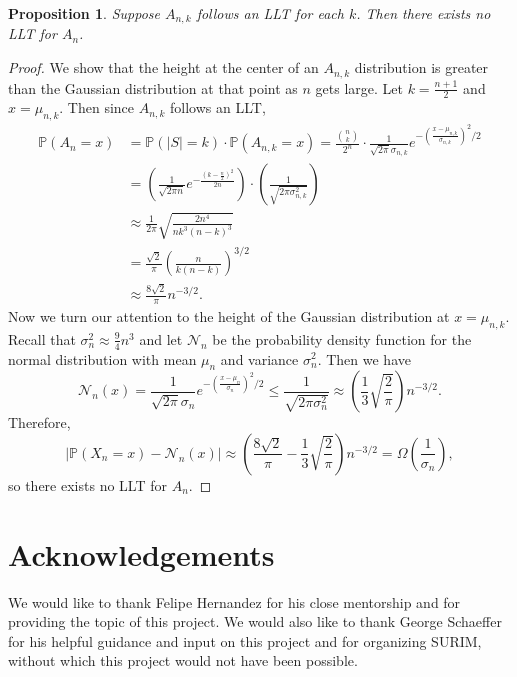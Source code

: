\documentclass[12pt]{article} %
\newcommand{\p}[1]{\left(#1\right)}
\newcommand{\abs}[1]{\left\lvert#1\right\rvert}
\renewcommand{\P}{\mathbb{P}}
\newtheorem{prop}[thm]{Proposition}
\theoremstyle{definition}
\theoremstyle{definition}
\begin{document}
\begin{prop}
Suppose $A_{n,k}$ follows an LLT for each $k$. Then there exists no LLT for $A_n$.
\end{prop}

\begin{proof}
We show that the height at the center of an $A_{n,k}$ distribution is greater than the Gaussian distribution at that point as $n$ gets large. 
Let $k = \frac{n+1}{2}$ and $x = \mu_{n,k}$. Then since $A_{n,k}$ follows an LLT,
\begin{align*}
\P(A_{n} = x) &= \P(|S| = k) \cdot \P(A_{n,k} = x) = \frac{{n\choose k}}{2^n} \cdot \frac{1}{\sqrt{2\pi}\sigma_{n,k}} e^{-\p{\frac{x-\mu_{n,k}}{\sigma_{n,k}}}^2/2} \\
&= \p{\frac{1}{\sqrt{2\pi n}} e^{-\frac{(k-\frac{n}{2})^2}{2n}}} \cdot \p{\frac{1}{\sqrt{2\pi\sigma_{n,k}^2}}} \\
& \approx \frac{1}{2\pi} \sqrt{\frac{2n^4}{nk^3(n-k)^3}} \\
&= \frac{\sqrt{2}}{\pi} \p{\frac{n}{k(n-k)}}^{3/2} \\
&\approx \frac{8\sqrt{2}}{\pi} n^{-3/2}.
\end{align*}
Now we turn our attention to the height of the Gaussian distribution at $x = \mu_{n,k}.$ Recall that $\sigma_n^2 \approx \frac{9}{4}n^3$ and let $\mathcal{N}_n$ be the probability density function for the normal distribution with mean $\mu_n$ and variance $\sigma_n^2$. Then we have
\[ \mathcal{N}_n(x) = \frac{1}{\sqrt{2\pi}\sigma_{n}} e^{-\p{\frac{x-\mu_{n}}{\sigma_{n}}}^2/2} \leq \frac{1}{\sqrt{2\pi\sigma_{n}^2}} \approx \p{\frac{1}{3} \sqrt{\frac{2}{\pi}}} n^{-3/2}.
\]
Therefore,
\[\abs{\P(X_n = x) - \mathcal{N}_n(x)} \approx \p{\frac{8\sqrt{2}}{\pi} - \frac{1}{3} \sqrt{\frac{2}{\pi}}} n^{-3/2} = \Omega\p{\frac{1}{\sigma_n}},\]
so there exists no LLT for $A_n$.


\end{proof}




\section{Acknowledgements}
We would like to thank Felipe Hernandez for his close mentorship and for providing the topic of this project. We would also like to thank George Schaeffer for his helpful guidance and input on this project and for organizing SURIM, without which this project would not have been possible.
\end{document}

